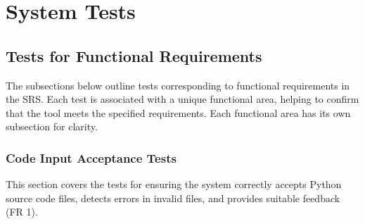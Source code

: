 \documentclass[12pt, titlepage]{article}
\begin{document}
\section{System Tests}

\subsection{Tests for Functional Requirements}

The subsections below outline tests corresponding to functional 
requirements in the SRS. Each test is associated with a unique 
functional area, helping to confirm that the tool meets the 
specified requirements. Each functional area has its own subsection 
for clarity.

\subsubsection{Code Input Acceptance Tests}

This section covers the tests for ensuring the system correctly accepts 
Python source code files, detects errors in invalid files, and provides 
suitable feedback (FR 1).
		
\end{document}
